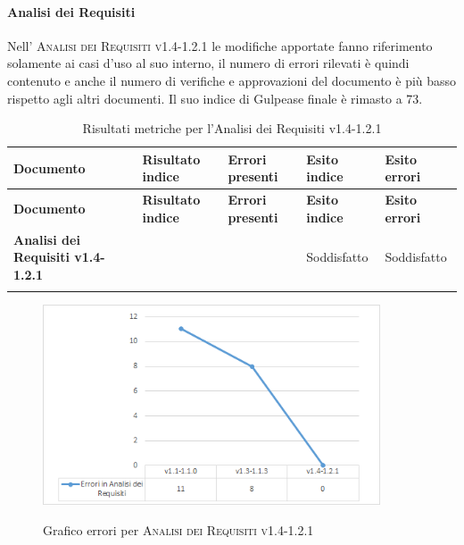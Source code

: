\documentclass[../piano-di-qualifica.tex]{subfiles}
\begin{document}
\paragraph{Analisi dei Requisiti}
\label{sub:analisi_dei_requisiti}
Nell' \textsc{Analisi dei Requisiti v1.4-1.2.1} le modifiche apportate fanno riferimento solamente ai casi d'uso al suo interno, il numero di errori rilevati è quindi contenuto e anche il numero di verifiche e approvazioni del documento è più basso rispetto agli altri documenti.
Il suo indice di Gulpease finale è rimasto a 73.

\renewcommand{\arraystretch}{2} %
\begin{longtable}[H]{>{\centering\bfseries}m{6cm} >{\centering}m{2cm} >{\centering}m{2.5cm} >{\centering}m{2.5cm} >{\centering\arraybackslash}m{2.5cm}}  
  \rowcolor{lightgray}
  {\textbf{Documento}} & {\textbf{Risultato indice}} & {\textbf{Errori presenti}} & {\textbf{Esito indice}} & {\textbf{Esito errori}}  \\
  \endfirsthead%
  \rowcolor{lightgray}
  {\textbf{Documento}} & {\textbf{Risultato indice}} & {\textbf{Errori presenti}} & {\textbf{Esito indice}} & {\textbf{Esito errori}}  \\
  \endhead%
  \textbf{Analisi dei Requisiti v1.4-1.2.1} & 73                 & 0               & Soddisfatto & Soddisfatto \\
  \caption{Risultati metriche per l'Analisi dei Requisiti v1.4-1.2.1}
  \label{tab:my-table}
\end{longtable}

\begin{figure}[H]
  \centering
  \includegraphics[width=10cm]{img/erroriAdRv1.4-1.2.1.png}
  \label{fig:errori_adr}
  \caption{Grafico errori per \textsc{Analisi dei Requisiti v1.4-1.2.1}}
\end{figure}
\end{document}
